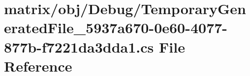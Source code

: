 \hypertarget{matrix_2obj_2_debug_2_temporary_generated_file__5937a670-0e60-4077-877b-f7221da3dda1_8cs}{\section{matrix/obj/\-Debug/\-Temporary\-Generated\-File\-\_\-5937a670-\/0e60-\/4077-\/877b-\/f7221da3dda1.cs File Reference}
\label{matrix_2obj_2_debug_2_temporary_generated_file__5937a670-0e60-4077-877b-f7221da3dda1_8cs}
}
